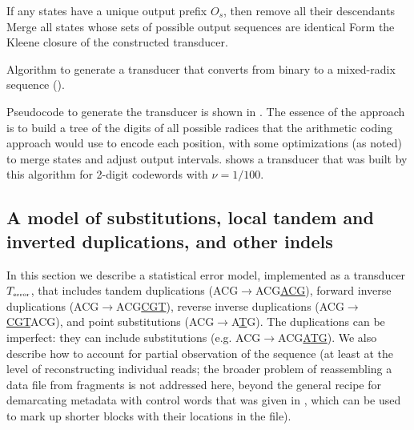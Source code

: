 \documentclass[english]{article}
\begin{document}
\begin{algorithm}
    If any states have a unique output prefix $O_s$, then remove all their descendants
        \;
        Merge all states whose sets of possible output sequences are identical
        \;
        Form the Kleene closure of the constructed transducer.
\caption{
  Algorithm to generate a transducer that converts from binary to a mixed-radix sequence
  ().
}
\end{algorithm}

Pseudocode to generate the transducer is shown in .
The essence of the approach is to build a tree of the digits of all possible radices that the arithmetic coding approach
would use to encode each position, with some optimizations (as noted) to merge states and adjust output intervals.
 shows a transducer that was built by this algorithm
for 2-digit codewords with $\nu=1/100$.

\subsection{A model of substitutions, local tandem and inverted duplications, and other indels}

In this section we describe a statistical error model,
implemented as a transducer $T_{\mbox{\tiny error}}$,
that includes
tandem duplications (ACG$\to$ACG\underline{ACG}),
forward inverse duplications (ACG$\to$ACG\underline{CGT}),
reverse inverse duplications (ACG$\to$\underline{CGT}ACG),
and point substitutions (ACG$\to$A\underline{T}G).
The duplications can be imperfect: they can include substitutions
(e.g. ACG$\to$ACG\underline{A\underline{T}G}).
We also describe how to account for partial observation of the sequence
(at least at the level of reconstructing individual reads;
the broader problem of reassembling a data file from fragments is not addressed here,
beyond the general recipe for demarcating metadata with control words
that was given in , which can be used to mark up shorter blocks
with their locations in the file).
\end{document}

